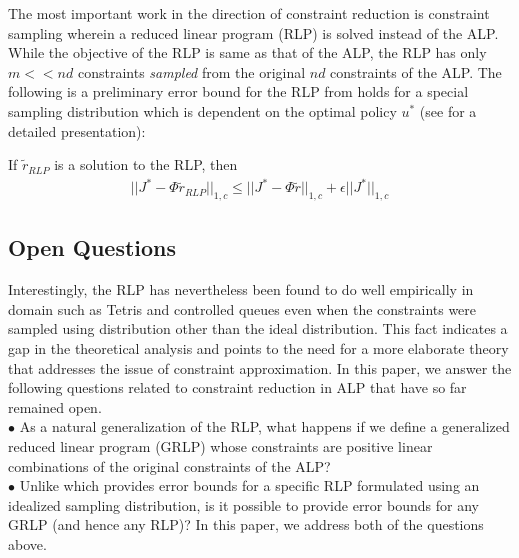The most important work in the direction of constraint reduction is constraint sampling \cite{CS} wherein a reduced linear program (RLP) is solved instead of the ALP. While the objective of the RLP is same as that of the ALP, the RLP has only $m<<nd$ constraints \emph{sampled} from the original $nd$ constraints of the ALP.  The following is a preliminary error bound for the RLP from \cite{CS} holds for a special sampling distribution which is dependent on the optimal policy $u^*$ (see \cite{CS} for a detailed presentation):
\begin{theorem}
If $\tilde{r}_{RLP}$ is a solution to the RLP, then
\begin{align*}
||J^*-\Phi\tilde{r}_{RLP}||_{1,c}\leq ||J^*-\Phi\tilde{r}||_{1,c}+\epsilon ||J^*||_{1,c}
\end{align*}
\end{theorem}
\subsection{Open Questions}
Interestingly, the RLP has nevertheless been found to do well empirically in domain such as Tetris \cite{CST} and controlled queues \cite{CS} even when the constraints were sampled using distribution other than the ideal distribution. This fact indicates a gap in the theoretical analysis and points to the need for a more elaborate theory that addresses the issue of constraint approximation. In this paper, we answer the following questions related to constraint reduction in ALP that have so far remained open. \\
$\bullet$ As a natural generalization of the RLP, what happens if we define a generalized reduced linear program (GRLP) whose constraints are positive linear combinations of the original constraints of the ALP?\\
$\bullet$ Unlike \cite{CS} which provides error bounds for a specific RLP formulated using an idealized sampling distribution, is it possible to provide error bounds for any GRLP (and hence any RLP)?
In this paper, we address both of the questions above.
